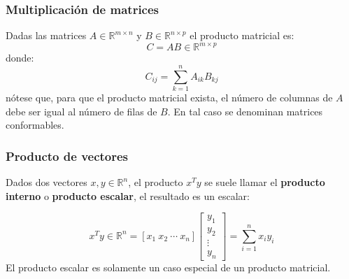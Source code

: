 \documentclass[10pt]{beamer}
\begin{document}
\begin{frame}
    \frametitle{Multiplicación de matrices}
    Dadas las matrices $A \in \mathbb{R}^{m\times n}$ y $B \in \mathbb{R}^{n\times p}$ el 
    producto matricial es:
    \begin{equation}
        C = AB \in \mathbb{R}^{m \times p}
    \end{equation}
    donde:
    \begin{equation}
        C_{ij}= \sum_{k = 1}^n A_{ik}B_{kj}
    \end{equation}
    nótese que, para que el producto matricial exista, el número de columnas de $A$ debe 
    ser igual al número de filas de $B$. En tal caso se denominan matrices conformables.

\end{frame}

\begin{frame}
    \frametitle{Producto de vectores}
    Dados dos vectores $x,y \in \mathbb{R}^n$, el producto $x^T y$ se suele llamar el \textbf{producto interno}
    o \textbf{producto escalar}, el resultado es un escalar:
    
    \begin{equation}
        x^Ty \in \mathbb{R}^n = [x_1 \ x_2 \ \cdots \ x_n]\begin{bmatrix}
            y_1\\
            y_2\\
            \vdots \\
            y_n
        \end{bmatrix} = \sum_{i=1}^n x_i y_i
    \end{equation}
    El producto escalar es solamente un caso especial de un producto matricial.
    
\end{frame}
\end{document}
